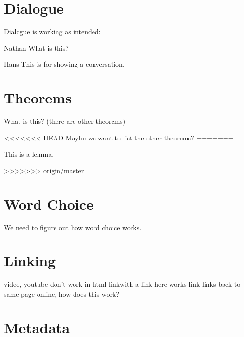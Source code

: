 \documentclass{ximera}
\begin{document}
\section{Dialogue}

Dialogue is working as intended:

\begin{dialogue}
\item[Nathan] What is this?
\item[Hans] This is for showing a conversation.
\end{dialogue}



\section{Theorems}

\begin{theorem}
What is this? (there are other theorems)
\end{theorem}

<<<<<<< HEAD
Maybe we want to list the other theorems?
=======
\begin{lemma}
This is a lemma.
\end{lemma}
>>>>>>> origin/master



\section{Word Choice}

We need to figure out how word choice works.



\section{Linking}

video, youtube don't work in html
link{with a link here} works
link{} links back to same page online, how does this work?

\link{} %



\section{Metadata}
\end{document}
